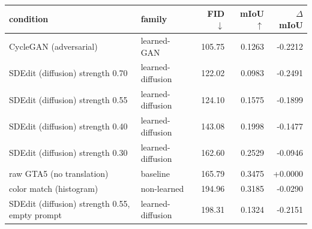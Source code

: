 \begin{tabular}{llrrr}
\toprule
condition & family & FID $\downarrow$ & mIoU $\uparrow$ & $\Delta$mIoU \\
\midrule
CycleGAN (adversarial) & learned-GAN & 105.75 & 0.1263 & -0.2212 \\
SDEdit (diffusion) strength 0.70 & learned-diffusion & 122.02 & 0.0983 & -0.2491 \\
SDEdit (diffusion) strength 0.55 & learned-diffusion & 124.10 & 0.1575 & -0.1899 \\
SDEdit (diffusion) strength 0.40 & learned-diffusion & 143.08 & 0.1998 & -0.1477 \\
SDEdit (diffusion) strength 0.30 & learned-diffusion & 162.60 & 0.2529 & -0.0946 \\
raw GTA5 (no translation) & baseline & 165.79 & 0.3475 & +0.0000 \\
color match (histogram) & non-learned & 194.96 & 0.3185 & -0.0290 \\
SDEdit (diffusion) strength 0.55, empty prompt & learned-diffusion & 198.31 & 0.1324 & -0.2151 \\
\bottomrule
\end{tabular}
